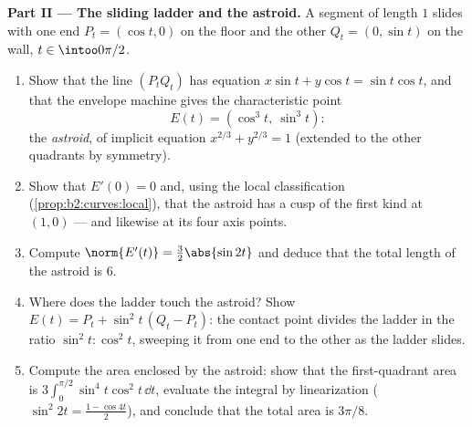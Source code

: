 \begin{problem}
\medskip
\noindent\textbf{Part II --- The sliding ladder and the
astroid.} A segment of length $1$ slides with one end $P_t =
(\cos t, 0)$ on the floor and the other $Q_t = (0, \sin t)$ on
the wall, $t \in \intoo0{\pi/2}$.
\begin{enumerate}[resume]
  \item Show that the line $(P_tQ_t)$ has equation $x\sin t +
        y\cos t = \sin t\cos t$, and that the envelope machine
        gives the characteristic point
        \[
        E(t) = (\cos^3 t,\ \sin^3 t) :
        \]
        the \emph{astroid}, of implicit
        equation $x^{2/3} + y^{2/3} = 1$ (extended to the
        other quadrants by symmetry).
  \item Show that $E'(0) = 0$ and, using the local
        classification (\cref{prop:b2:curves:local}), that
        the astroid has a cusp of the first kind at $(1, 0)$
        --- and likewise at its four axis points.
  \item Compute $\norm{E'(t)} = \tfrac32\abs{\sin 2t}$ and
        deduce that the total length of the astroid is $6$.
  \item Where does the ladder touch the astroid? Show $E(t) =
        P_t + \sin^2 t\,(Q_t - P_t)$: the contact point
        divides the ladder in the ratio $\sin^2 t : \cos^2
        t$, sweeping it from one end to the other as the
        ladder slides.
  \item Compute the area enclosed by the astroid: show that
        the first-quadrant area is $3\int_0^{\pi/2}\sin^4
        t\cos^2 t\,\dd t$, evaluate the integral by
        linearization ($\sin^2 2t = \tfrac{1 - \cos 4t}2$),
        and conclude that the total area is $3\pi/8$.
\end{enumerate}


\end{problem}
